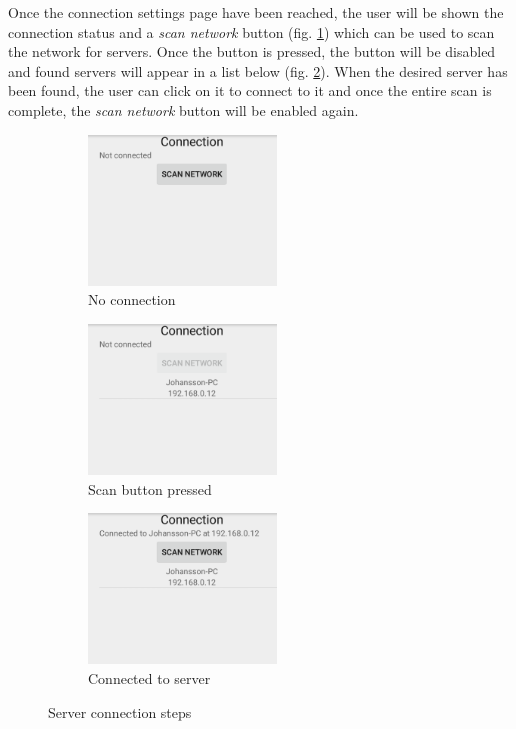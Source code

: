 \documentclass[12pt,a4paper,notitlepage]{report}
\begin{document}
Once the connection settings page have been reached, the user will be shown the connection status and a \textit{scan network} button (fig. \ref{fig:scan1}) which can be used to scan the network for servers. Once the button is pressed, the button will be disabled and found servers will appear in a list below (fig. \ref{fig:scan2}). When the desired server has been found, the user can click on it to connect to it and once the entire scan is complete, the \textit{scan network} button will be enabled again.

\begin{figure}[ht!]
\centering
\begin{subfigure}{.5\textwidth}
  \centering
  \includegraphics[width=50mm]{images/appgui/scan1.png}
  \caption{No connection}
  \label{fig:scan1}
\end{subfigure}%
\begin{subfigure}{.5\textwidth}
  \centering
  \includegraphics[width=50mm]{images/appgui/scan2.png}
  \caption{Scan button pressed}
  \label{fig:scan2}
\end{subfigure}
\begin{subfigure}{.5\textwidth}
  \centering
  \includegraphics[width=50mm]{images/appgui/scan3.png}
  \caption{Connected to server}
  \label{fig:scan3}
\end{subfigure}
\caption{Server connection steps}
\label{fig:scan}
\end{figure}
\end{document}
